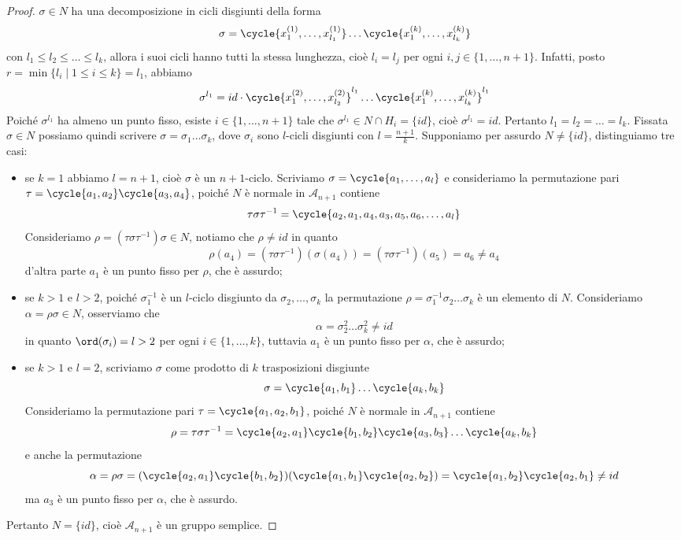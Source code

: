 \documentclass[11pt]{scrartcl}
\begin{document}
\begin{proof}
		$\sigma \in N$ ha una decomposizione in cicli disgiunti
		della forma
		\[
		\sigma = \cycle{x_1^{(1)}, \ldots, x_{l_1}^{(1)}}\ldots\cycle{x_1^{(k)}, \ldots, x_{l_k}^{(k)}}
		\]
		con $l_1\leqslant l_2\leqslant \ldots\leqslant l_k$, allora i suoi cicli 
		hanno tutti la stessa lunghezza, cioè $l_i = l_j$ per ogni $i, j \in \{1, \ldots, n + 1\}$.
		Infatti, posto $r = \min\{l_i\mid 1\leqslant i \leqslant k\} = l_1$, 
		abbiamo
		\[
		\sigma^{l_1} = id \cdot \cycle{x_1^{(2)}, \ldots, x_{l_2}^{(2)}}^{l_1}
		\ldots\cycle{x_1^{(k)}, \ldots, x_{l_k}^{(k)}}^{l_1}
		\]
		Poiché $\sigma^{l_1}$ ha almeno un punto fisso, esiste $i \in \{1, \ldots, n + 1\}$
		tale che $\sigma^{l_1} \in N\cap H_i = \{id\}$, cioè $\sigma^{l_1} = id$. Pertanto 
		$l_1 = l_2 = \ldots = l_k$. Fissata $\sigma \in N$ possiamo quindi scrivere
		$\sigma = \sigma_1\ldots\sigma_k$,
		dove $\sigma_i$ sono $l$-cicli disgiunti con $l = \displaystyle\frac{n + 1}{k}$.
		Supponiamo per assurdo $N \neq \{id\}$, distinguiamo tre casi:
		\begin{itemize}
			\item se $k = 1$ abbiamo $l = n + 1$, cioè $\sigma$ è un $n + 1$-ciclo.
			Scriviamo $\sigma = \cycle{a_1, \ldots, a_l}$ e consideriamo la permutazione
			pari $\tau = \cycle{a_1, a_2}\cycle{a_3, a_4}$, poiché $N$ è normale in 
			$\mathcal{A}_{n + 1}$ contiene
			\[
			\tau\sigma\tau^{-1} = \cycle{a_2, a_1, a_4, a_3, a_5, a_6, \ldots, a_l}
			\]
			Consideriamo $\rho = (\tau\sigma\tau^{-1})\sigma \in N$, notiamo che
			$\rho \neq id$ in quanto
			\[
			\rho(a_4) = (\tau\sigma\tau^{-1})(\sigma(a_4)) = (\tau\sigma\tau^{-1})(a_5) = 
			a_6 \neq a_4
			\]
			d'altra parte $a_1$ è un punto fisso per $\rho$, che è assurdo;
			\item se $k > 1$ e $l > 2$, poiché $\sigma_1^{-1}$ è un $l$-ciclo
			disgiunto da $\sigma_2, \ldots, \sigma_k$ la permutazione 
			$\rho = \sigma_1^{-1}\sigma_2\ldots\sigma_k$ è un elemento di $N$. 
			Consideriamo $\alpha = \rho\sigma \in N$, osserviamo che 
			\[
			\alpha = \sigma_2^2\ldots\sigma_k^2 \neq id
			\]
			in quanto $\ord(\sigma_i) = l > 2$ per ogni $i \in \{1, \ldots, k\}$,
			tuttavia $a_1$ è un punto fisso per $\alpha$, che è assurdo;
			\item se $k > 1$ e $l = 2$, scriviamo $\sigma$ come prodotto di $k$
			trasposizioni disgiunte
			\[
			\sigma = \cycle{a_1, b_1}\ldots\cycle{a_k, b_k}
			\]
			Consideriamo la permutazione pari $\tau = \cycle{a_1, a_2, b_1}$,
			poiché $N$ è normale in $\mathcal{A}_{n + 1}$ contiene
			\[
			\rho = \tau\sigma\tau^{-1} = \cycle{a_2, a_1}\cycle{b_1, b_2}
			\cycle{a_3, b_3}\ldots\cycle{a_k, b_k}
			\]
			e anche la permutazione 
			\[
			\alpha = \rho\sigma = (\cycle{a_2, a_1}\cycle{b_1, b_2})
			(\cycle{a_1, b_1}\cycle{a_2, b_2}) = \cycle{a_1, b_2}\cycle{a_2, b_1} \neq id
			\]
			ma $a_3$ è un punto fisso per $\alpha$, che è assurdo.
		\end{itemize}
		Pertanto $N = \{id\}$, cioè $\mathcal{A}_{n + 1}$ è un gruppo semplice.
	\end{proof}
	
\end{document}
